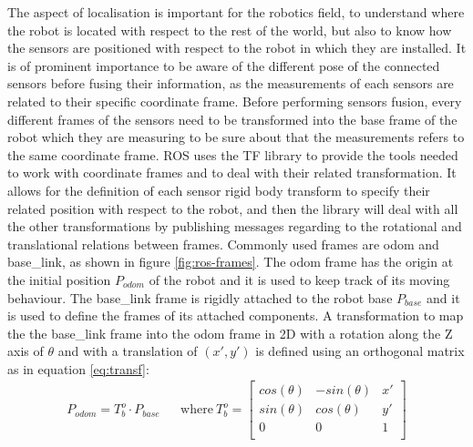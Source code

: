 The aspect of localisation is important for the robotics field, to understand where the robot is located with respect to the rest of the world, but also to know how the sensors are positioned with respect to the robot in which they are installed.
It is of prominent importance to be aware of the different pose of the connected sensors before fusing their information, as the measurements of each sensors are related to their specific coordinate frame.
Before performing sensors fusion, every different frames of the sensors need to be transformed into the base frame of the robot which they are measuring to be sure about that the measurements refers to the same coordinate frame.
\Gls{ROS} uses the TF\cite{6556373} library to provide the tools needed to work with coordinate frames and to deal with their related transformation.
It allows for the definition of each sensor rigid body transform to specify their related position with respect to the robot, and then the library will deal with all the other transformations by publishing messages regarding to the rotational and translational relations between frames.
Commonly used frames are odom and base\_link, as shown in figure \ref{fig:ros-frames}. The odom frame has the origin at the initial position $P_{odom}$ of the robot and it is used to keep track of its moving behaviour. The base\_link frame is rigidly attached to the robot base $P_{base}$ and it is used to define the frames of its attached components. A transformation to map the the base\_link frame into the odom frame in \Gls{2D} with a rotation along the Z axis of $\theta$ and with a translation of $(x',y')$ is defined using an orthogonal matrix as in equation \ref{eq:transf}:
\begin{align}
	P_{odom} = T^o_b \cdot P_{base} && \textrm{where} ~
	T^o_b =
	\begin{bmatrix}
		cos(\theta) & -sin(\theta) & x' \\
		sin(\theta) & cos(\theta) & y' \\
		0 & 0 & 1 \\
	\end{bmatrix}
	\label{eq:transf}
\end{align}


